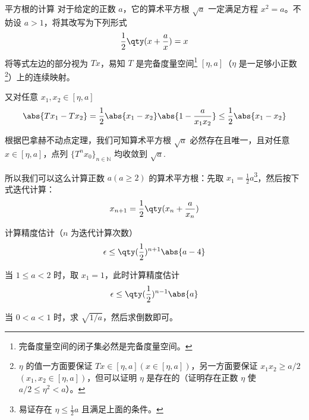 \begin{example}{平方根的计算}
对于给定的正数 $a$，它的算术平方根 $\sqrt{a}$ 一定满足方程 $x^2=a$。不妨设 $a>1$，将其改写为下列形式
\begin{equation}
\frac{1}{2}\qty(x+\frac{a}{x})=x
\end{equation}
将等式左边的部分视为 $Tx$，易知 $T$ 是完备度量空间\footnote{完备度量空间的闭子集必然是完备度量空间。} $[\eta,a]$（$\eta$ 是一足够小正数\footnote{$\eta$ 的值一方面要保证 $Tx\in[\eta,a](x\in[\eta,a])$，另一方面要保证 $x_1x_2 \geq a/2$ $(x_1,x_2\in[\eta,a])$，但可以证明 $\eta$ 是存在的（证明存在正数 $\eta$ 使 $a/2\leq \eta^2<a$）。}）上的连续映射。

又对任意 $x_1,x_2\in [\eta,a]$
\begin{equation}
\abs{Tx_1 -  Tx_2}=\frac{1}{2}\abs{x_1 - x_2}\abs{1-\frac{a}{x_1x_2}}\leq\frac{1}{2}\abs{x_1 - x_2}
\end{equation}

根据巴拿赫不动点定理，我们可知算术平方根 $\sqrt{a}$ 必然存在且唯一，且对任意 $x\in[\eta,a]$，点列 $\{T^nx_0\}_{n\in\mathbb{N}}$ 均收敛到 $\sqrt{a}$.

所以我们可以这么计算正数 $a(a\geq 2)$ 的算术平方根：先取 $x_1=\frac{1}{2}a$\footnote{易证存在 $\eta\leq\frac{1}{2}a$ 且满足上面的条件。}，然后按下式迭代计算：
\begin{equation}
x_{n+1}=\frac{1}{2}\qty(x_n+\frac{a}{x_n})
\end{equation}

计算精度估计（$n$ 为迭代计算次数）
\begin{equation}
\epsilon\leq\qty(\frac{1}{2})^{n+1}\abs{a-4}
\end{equation}

当 $1\leq a<2$ 时，取 $x_1=1$，此时计算精度估计
\begin{equation}
\epsilon\leq\qty(\frac{1}{2})^{n-1}\abs{a}
\end{equation}

当 $0<a<1$ 时，求 $\sqrt{1/a}$，然后求倒数即可。
\end{example}
